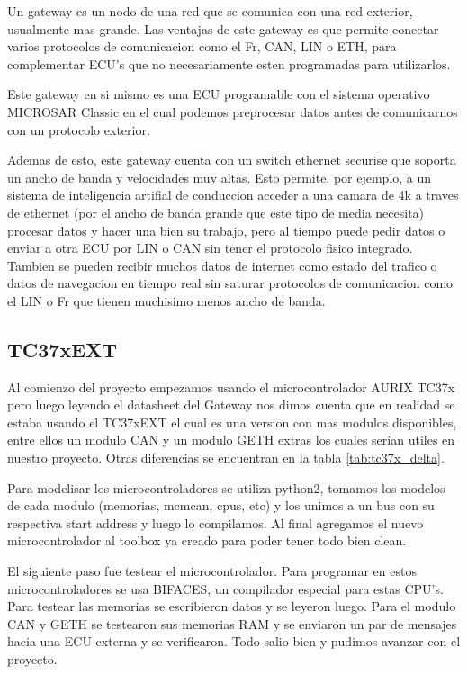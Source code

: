 Un gateway es un nodo de una red que se comunica con una red exterior, usualmente mas grande. Las ventajas de este gateway es que permite conectar varios protocolos de comunicacion como el Fr, CAN, LIN o ETH, para complementar ECU's que no necesariamente esten programadas para utilizarlos. 

Este gateway en si mismo es una ECU programable con el sistema operativo MICROSAR Classic en el cual podemos preprocesar datos antes de comunicarnos con un protocolo exterior. 

Ademas de esto, este gateway cuenta con un switch ethernet securise que soporta un ancho de banda y velocidades muy altas. Esto permite, por ejemplo, a un sistema de inteligencia artifial de conduccion acceder a una camara de 4k a traves de ethernet (por el ancho de banda grande que este tipo de media necesita) procesar datos y hacer una bien su trabajo, pero al tiempo puede pedir datos o enviar a otra ECU por LIN o CAN sin tener el protocolo fisico integrado. Tambien se pueden recibir muchos datos de internet como estado del trafico o datos de navegacion en tiempo real sin saturar protocolos de comunicacion como el LIN o Fr que tienen muchisimo menos ancho de banda.


\subsection{TC37xEXT}
Al comienzo del proyecto empezamos usando el microcontrolador AURIX TC37x \cite{aurix.tc37x} pero luego leyendo el datasheet del Gateway nos dimos cuenta que en realidad se estaba usando el TC37xEXT \cite{aurix.tc37e} el cual es una version con mas modulos disponibles, entre ellos un modulo CAN y un modulo GETH extras los cuales serian utiles en nuestro proyecto. Otras diferencias se encuentran en la tabla \ref{tab:tc37x_delta}.



Para modelisar los microcontroladores se utiliza python2, tomamos los modelos de cada modulo (memorias, mcmcan, cpus, etc) y los unimos a un bus con su respectiva start address y luego lo compilamos. Al final agregamos el nuevo microcontrolador al toolbox ya creado para poder tener todo bien clean.

El siguiente paso fue testear el microcontrolador. Para programar en estos microcontroladores se usa BIFACES, un compilador especial para estas CPU's. Para testear las memorias se escribieron datos y se leyeron luego. Para el modulo CAN y GETH se testearon sus memorias RAM y se enviaron un par de mensajes hacia una ECU externa  y se verificaron. Todo salio bien y pudimos avanzar con el proyecto.

